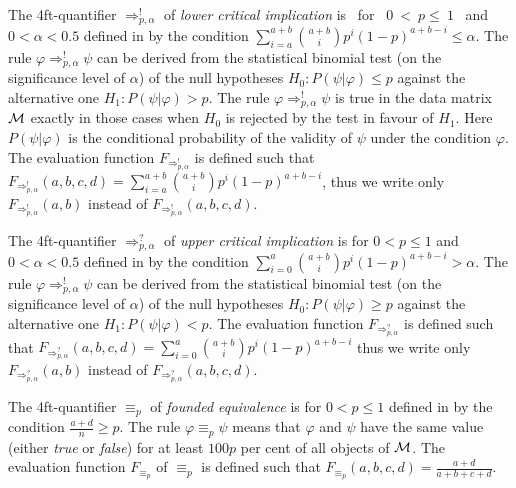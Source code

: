 The 4ft-quantifier $ \Rightarrow^{!}_{p, \alpha} $ of
 {\it lower critical implication} is \ for  \ $ 0 \ < \ p \leq \ 1 $ \ and \ 
 $ 0 < \alpha < 0.5$ defined in \cite{Ha:78} by the condition
$   \sum_{i = a}^{a + b} {a+b \choose i}
          p^{i} (1 - p)^{a+b-i} \leq \alpha $.
The rule $\varphi \Rightarrow^{!}_{p, \alpha}  \psi $ can be derived 
from the statistical binomial test (on the significance level of $ \alpha $)
of the null hypotheses $H_{0}: P(\psi | \varphi ) \leq p $ 
 against the  alternative  one  $H_{1}: P(\psi | \varphi ) > p $. 
The rule  $\varphi \Rightarrow^{!}_{p, \alpha}  \psi $ is true in the 
data matrix ${\cal M }$ exactly in those cases when $H_{0}$
is rejected by the test in favour of $H_{1}$. 
Here $ P(\psi | \varphi ) $  is  the conditional probability of the
validity  of $ \psi$  under the condition $ \varphi $.
The evaluation function $ F_{\Rightarrow^{!}_{p, \alpha}}$ %
is defined such that 
$ F_{\Rightarrow^{!}_{p, \alpha}}(a,b,c,d) = \sum_{i = a}^{a + b} {a+b \choose i}
          p^{i} (1 - p)^{a+b-i} $, thus we write only 
$ F_{\Rightarrow^{!}_{p, \alpha}}(a,b)$ instead of $ F_{\Rightarrow^{!}_{p, \alpha}}(a,b,c,d)$.


The 4ft-quantifier $ \Rightarrow^{?}_{p, \alpha} $ of
 {\it upper critical implication} is for  $ 0 < p \leq 1 $ and 
 $ 0 < \alpha < 0.5$ defined in \cite{Ha:78} by the condition
$   \sum_{i = 0}^{a} {a+b \choose i}
          p^{i} (1 - p)^{a+b-i} > \alpha $.
The rule $\varphi \Rightarrow^{!}_{p, \alpha}  \psi $ can be derived 
from the statistical binomial test (on the significance level of $ \alpha $)
of the null hypotheses $H_{0}: P(\psi | \varphi ) \geq p $ 
 against the  alternative  one  $H_{1}: P(\psi | \varphi ) < p $. 
The evaluation function $ F_{\Rightarrow^{?}_{p, \alpha}}$ %
is defined such that 
$ F_{\Rightarrow^{?}_{p, \alpha}}(a,b,c,d) =    \sum_{i = 0}^{a} {a+b \choose i}  p^{i} (1 - p)^{a+b-i} $
          thus we write only 
$ F_{\Rightarrow^{?}_{p, \alpha}}(a,b)$ instead of $ F_{\Rightarrow^{?}_{p, \alpha}}(a,b,c,d)$.


The 4ft-quantifier $ \equiv_{p} $ of {\it founded
equivalence \/} is for $ 0 < p \leq 1 $   
defined in \cite{Ha:83} by the condition
$ \frac{a+d}{n} \geq p $. 
The rule $\varphi \equiv_{p}  \psi $   means that $\varphi$ and $\psi$ have the same value (either
{\it true} or {\it false}) for at least $100p$ per cent of all
objects of ${\cal M }$. 
The evaluation function $ F_{\equiv_{p}}$
of $\equiv_{p}$ is defined such that 
$ F_{\equiv_{p}}(a,b,c,d) = \frac{a+d}{a+b+c+d} $.

